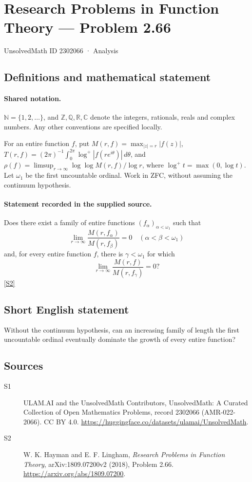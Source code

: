 \documentclass[11pt]{article}
\newcommand{\sref}[2]{\hyperlink{source:#1:#2}{[S#2]}}
\begin{document}
\setcounter{section}{2302065}
\section{Research Problems in Function Theory — Problem 2.66}\label{2302066}
{\small\sffamily UnsolvedMath ID 2302066 · Analysis}
\subsection{Definitions and mathematical statement}

\paragraph{Shared notation.}$\mathbb N=\{1,2,\ldots\}$, and $\mathbb Z,\mathbb Q,\mathbb R,\mathbb C$ denote the integers, rationals, reals and complex numbers. Any other conventions are specified locally.


For an entire function $f$, put $M(r,f)=\max_{|z|=r}|f(z)|$, $T(r,f)=(2\pi)^{-1}\int_0^{2\pi}\log^+|f(re^{i\theta})|\,d\theta$, and $\rho(f)=\limsup_{r\to\infty}\log\log M(r,f)/\log r$, where $\log^+t=\max(0,\log t)$. Let $\omega_1$ be the first uncountable ordinal. Work in ZFC, without assuming the continuum hypothesis.
\paragraph{Statement recorded in the supplied source.}
Does there exist a family of entire functions $(f_\alpha)_{\alpha<\omega_1}$ such that
\[
\lim_{r\to\infty}\frac{M(r,f_\alpha)}{M(r,f_\beta)}=0\quad(\alpha<\beta<\omega_1)
\]
and, for every entire function $f$, there is $\gamma<\omega_1$ for which
\[\lim_{r\to\infty}\frac{M(r,f)}{M(r,f_\gamma)}=0?\] \sref{2302066}{2}
\subsection{Short English statement}
Without the continuum hypothesis, can an increasing family of length the first uncountable ordinal eventually dominate the growth of every entire function?
\subsection{Sources}
\begin{description}
\item[\hypertarget{source:2302066:1}{S1}] ULAM.AI and the UnsolvedMath Contributors, UnsolvedMath: A Curated Collection of Open Mathematics Problems, record 2302066 (AMR-022-2066). CC BY 4.0. \url{https://huggingface.co/datasets/ulamai/UnsolvedMath}.
\item[\hypertarget{source:2302066:2}{S2}] W. K. Hayman and E. F. Lingham, \emph{Research Problems in Function Theory}, arXiv:1809.07200v2 (2018), Problem 2.66. \url{https://arxiv.org/abs/1809.07200}.
\end{description}
\label{end:2302066}
\end{document}
